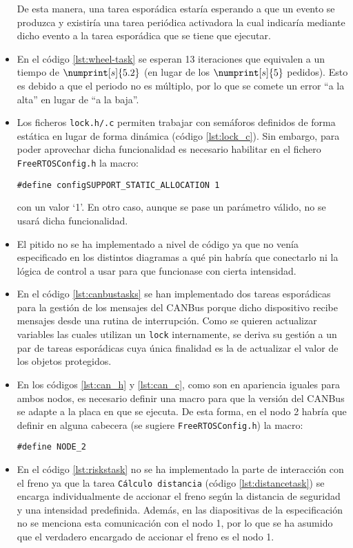\begin{itemize}
        De esta manera, una tarea esporádica estaría esperando a que un evento se
        produzca y existiría una tarea periódica activadora la cual indicaría
        mediante dicho evento a la tarea esporádica que se tiene que ejecutar.
  \item En el código \ref{lst:wheel-task} se esperan 13 iteraciones que equivalen a un
        tiempo de $\numprint[s]{5.2}$ (en lugar de los $\numprint[s]{5}$ pedidos). Esto
        es debido a que el periodo no es múltiplo, por lo que se comete un error
        ``a la alta'' en lugar de ``a la baja''.
  \item Los ficheros \texttt{lock.h/.c} permiten trabajar con semáforos definidos de
        forma estática en lugar de forma dinámica (código \ref{lst:lock_c}). Sin embargo,
        para poder aprovechar dicha funcionalidad es necesario habilitar en el fichero
        \texttt{FreeRTOSConfig.h} la macro:
        \begin{center}
            \lstinline[style=C]!#define configSUPPORT_STATIC_ALLOCATION 1!
        \end{center}
        con un valor `1'. En otro caso, aunque se pase un parámetro válido, no se usará
        dicha funcionalidad.
  \item El pitido no se ha implementado a nivel de código ya que no venía especificado
        en los distintos diagramas a qué pin habría que conectarlo ni la lógica de
        control a usar para que funcionase con cierta intensidad.
  \item En el código \ref{lst:canbustasks} se han implementado dos tareas esporádicas
        para la gestión de los mensajes del CANBus porque dicho dispositivo recibe 
        mensajes desde una rutina de interrupción. Como se quieren
        actualizar variables las cuales utilizan un \texttt{lock} internamente, se
        deriva su gestión a un par de tareas esporádicas cuya única finalidad es la
        de actualizar el valor de los objetos protegidos.
  \item En los códigos \ref{lst:can_h} y \ref{lst:can_c}, como son en apariencia iguales
        para ambos nodos, es necesario definir una macro para que la versión del CANBus
        se adapte a la placa en que se ejecuta. De esta forma, en el nodo 2 habría que
        definir en alguna cabecera (se sugiere \texttt{FreeRTOSConfig.h}) la macro:
        \begin{center}
              \lstinline[style=C]!#define NODE_2!
        \end{center}
  \item En el código \ref{lst:riskstask} no se ha implementado la parte de interacción
        con el freno ya que la tarea \texttt{Cálculo distancia} (código \ref{lst:distancetask})
        se encarga individualmente de accionar el freno según la distancia de seguridad
        y una intensidad predefinida. Además, en las diapositivas de la especificación
        no se menciona esta comunicación con el nodo 1, por lo que se ha asumido que
        el verdadero encargado de accionar el freno es el nodo 1.
\end{itemize}